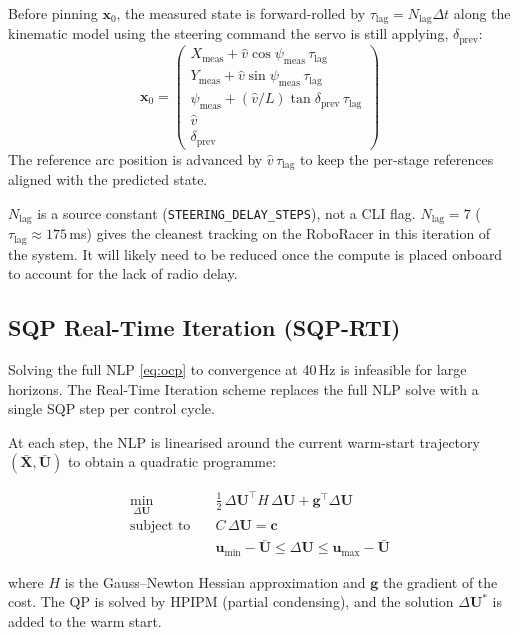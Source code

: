 \documentclass[11pt]{article}
\begin{document}
Before pinning $\bm{x}_0$, the measured state is forward-rolled by
$\tau_{\text{lag}} = N_{\text{lag}} \Delta t$ along the kinematic model
using the steering command the servo is still applying,
$\delta_{\text{prev}}$:
\[
\bm{x}_0 = \begin{pmatrix}
X_{\text{meas}} + \hat{v}\cos\psi_{\text{meas}}\,\tau_{\text{lag}} \\
Y_{\text{meas}} + \hat{v}\sin\psi_{\text{meas}}\,\tau_{\text{lag}} \\
\psi_{\text{meas}} + (\hat{v}/L)\tan\delta_{\text{prev}}\,\tau_{\text{lag}} \\
\hat{v} \\
\delta_{\text{prev}}
\end{pmatrix}
\]
The reference arc position is advanced by $\hat{v}\,\tau_{\text{lag}}$ to
keep the per-stage references aligned with the predicted state.

$N_{\text{lag}}$ is a source constant (\texttt{STEERING\_DELAY\_STEPS}),
not a CLI flag.  $N_{\text{lag}} = 7$ ($\tau_{\text{lag}} \approx 175$\,ms)
gives the cleanest tracking on the RoboRacer in this iteration of the system. It will likely need to be reduced once the compute is placed onboard to account for the lack of radio delay. 

\subsection{SQP Real-Time Iteration (SQP-RTI)}

Solving the full NLP \eqref{eq:ocp} to convergence at 40\,Hz is infeasible for
large horizons.  The Real-Time Iteration scheme
replaces the full NLP solve with a single SQP step per control cycle.

At each step, the NLP is linearised around the current warm-start trajectory
$(\bar{\bm{X}}, \bar{\bm{U}})$ to obtain a quadratic programme:

\begin{align}
\min_{\Delta\bm{U}} \quad
  &\frac{1}{2}\,\Delta\bm{U}^{\!\top} H\,\Delta\bm{U}
  + \bm{g}^{\!\top}\Delta\bm{U} \\
\text{subject to} \quad
  &C\,\Delta\bm{U} = \bm{c} \tag{linearised dynamics}\\
  &\bm{u}_{\min} - \bar{\bm{U}} \leq \Delta\bm{U} \leq \bm{u}_{\max} - \bar{\bm{U}} \tag{input bounds}
\end{align}

where $H$ is the Gauss--Newton Hessian approximation and $\bm{g}$ the gradient
of the cost.  The QP is solved by HPIPM (partial condensing), and the
solution $\Delta\bm{U}^*$ is added to the warm start.
\end{document}
